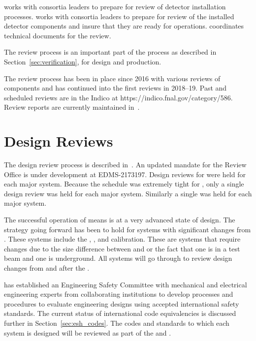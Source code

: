  works with consortia leaders to prepare for review of
detector installation processes.   works with consortia
leaders to prepare for review of the installed detector components and
insure that they are ready for operations.   coordinates
technical documents for the   review.

The review process is an important part of the  
process as described in Section~\ref{sec:verification}, for
design and production.

The review process has been in place since 2016 with various reviews
of  components and has continued into the first
 reviews in 2018--19. Past and scheduled reviews are in
the  Indico at https://indico.fnal.gov/category/586.
Review reports are currently maintained in~.

\section{Design Reviews}

The  design review process is described
in~. An updated mandate for the Review Office is under
development at EDMS-2173197\cite{bib:cernedms2173197}. Design reviews
for  were held for each major system. Because the
schedule was extremely tight for , only a single
design review was held for each major system. Similarly a single
 was held for each major system.

The successful operation of  means  is at
a very advanced state of design. The strategy going forward has been
to hold  for systems with significant changes from
. These systems include the , ,
 and calibration. These are systems that require changes
due to the size difference between  and 
or the fact that one is in a test beam and one is underground. All
systems will go through  to review design changes from
 and  after the .

 has established an Engineering Safety Committee with
mechanical and electrical engineering experts from collaborating
institutions to develop processes and procedures to evaluate
engineering designs using accepted international safety standards. The
current status of international code equivalencies is discussed
further in Section~\ref{sec:esh_codes}. The codes and standards to
which each system is designed will be reviewed as part of the
 and .

